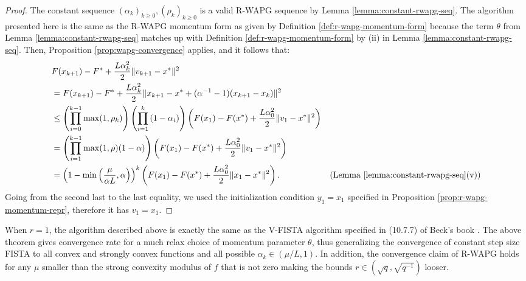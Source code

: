 \documentclass[12pt]{article}
\begin{document}
    \begin{proof}
        The constant sequence $(\alpha_k)_{k \ge 0}, (\rho_k)_{k \ge 0}$ is a valid R-WAPG sequence by Lemma \ref{lemma:constant-rwapg-seq}.
        The algorithm presented here is the same as the R-WAPG momentum form as given by Definition \ref{def:r-wapg-momentum-form} because the term $\theta$ from Lemma \ref{lemma:constant-rwapg-seq} matches up with Definition \ref{def:r-wapg-momentum-form} by (ii) in Lemma \ref{lemma:constant-rwapg-seq}.
        Then, Proposition \ref{prop:wapg-convergence} applies, and it follows that:
        \begin{align*}
            & F(x_{k + 1}) - F^* + \frac{L\alpha_k^2}{2}\Vert v_{k + 1} - x^*\Vert^2
            \\
            &=
            F(x_{k + 1}) - F^* + \frac{L\alpha_k^2}{2}\Vert x_{k + 1}  - x^* + (\alpha^{-1} - 1)(x_{k + 1} - x_k)\Vert^2
            \\
            &\le
            \left(
                \prod_{i = 0}^{k - 1} \max(1, \rho_{k})
            \right)
            \left(
                \prod_{i = 1}^{k} \left(1  - \alpha_i\right)
            \right)
            \left(
                F(x_1) - F(x^*) + \frac{L\alpha_0^2}{2}\Vert v_1 - x^*\Vert^2
            \right)
            \\
            &= \left(
                \prod_{i = 1}^{k - 1} \max(1, \rho)(1 - \alpha)
            \right)
            \left(
                F(x_1) - F(x^*) + \frac{L\alpha_0^2}{2}\Vert v_1 - x^*\Vert^2
            \right)
            \\
            &= \left(1 - \min\left(\frac{\mu}{\alpha L}, \alpha\right)\right)^k
            \left(
                F(x_1) - F(x^*) + \frac{L\alpha_0^2}{2}\Vert x_1 - x^*\Vert^2
            \right).
            & \text{(Lemma \ref{lemma:constant-rwapg-seq}(v))}
        \end{align*}
        Going from the second last to the last equality, we used the initialization condition $y_1 = x_1$ specified in Proposition \ref{prop:r-wapg-momentum-repr}, therefore it has $v_1 = x_1$.
    \end{proof}
    \begin{remark}
        When $r = 1$, the algorithm described above is exactly the same as the V-FISTA algorithm specified in (10.7.7) of Beck's book \cite{beck_first-order_2017}.
        The above theorem gives convergence rate for a much relax choice of momentum parameter $\theta$, thus generalizing the convergence of constant step size FISTA to all convex and strongly convex functions and all possible $\alpha_k \in (\mu/L, 1)$.
        In addition, the convergence claim of R-WAPG holds for any $\mu$ smaller than the strong convexity modulus of $f$ that is not zero making the bounds $r \in (\sqrt{q}, \sqrt{q^{-1}})$ looser.
    \end{remark}
\end{document}
